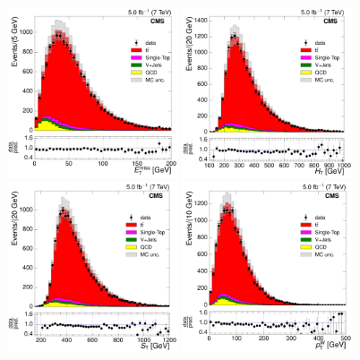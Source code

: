 \begin{figure}[hbtp]
    \centering
     \includegraphics[width=0.45\textwidth]{Chapters/04_Analysis/04b_XSections/images/control_plots/before_fit/7TeV/EPlusJets_patType1CorrectedPFMet_2orMoreBtags_with_ratio.pdf}\hfill
     \includegraphics[width=0.45\textwidth]{Chapters/04_Analysis/04b_XSections/images/control_plots/before_fit/7TeV/EPlusJets_HT_2orMoreBtags_with_ratio.pdf}\\
     \includegraphics[width=0.45\textwidth]{Chapters/04_Analysis/04b_XSections/images/control_plots/before_fit/7TeV/EPlusJets_patType1CorrectedPFMet_ST_2orMoreBtags_with_ratio.pdf}\hfill
     \includegraphics[width=0.45\textwidth]{Chapters/04_Analysis/04b_XSections/images/control_plots/before_fit/7TeV/EPlusJets_patType1CorrectedPFMet_WPT_2orMoreBtags_with_ratio.pdf}\\

\end{figure}
